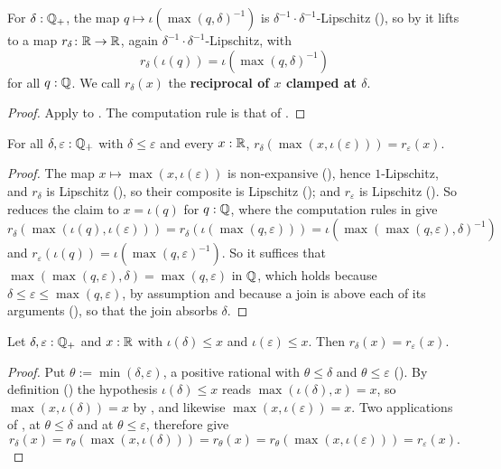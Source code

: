 \begin{definition}
  \label{boundedRecip}
  For $\delta : \mathbb{Q}_{+}$, the map $q \mapsto \iota(\max(q, \delta)^{-1})$ is $\delta^{-1} \cdot \delta^{-1}$-Lipschitz (), so by  it lifts to a map $r_\delta \colon \mathbb{R} \to \mathbb{R}$, again $\delta^{-1} \cdot \delta^{-1}$-Lipschitz, with
  \[
    r_\delta(\iota(q)) = \iota(\max(q, \delta)^{-1})
  \]
  for all $q : \mathbb{Q}$. We call $r_\delta(x)$ the \textbf{reciprocal of $x$ clamped at $\delta$}.
\end{definition}
\begin{proof}
  Apply  to . The computation rule is that of .
\end{proof}

\begin{lemma}
  \label{boundedRecipMax}
  For all $\delta, \varepsilon : \mathbb{Q}_{+}$ with $\delta \le \varepsilon$ and every $x : \mathbb{R}$, $r_\delta(\max(x, \iota(\varepsilon))) = r_\varepsilon(x)$.
\end{lemma}
\begin{proof}
  The map $x \mapsto \max(x, \iota(\varepsilon))$ is non-expansive (), hence $1$-Lipschitz, and $r_\delta$ is Lipschitz (), so their composite is Lipschitz (); and $r_\varepsilon$ is Lipschitz (). So  reduces the claim to $x = \iota(q)$ for $q : \mathbb{Q}$, where the computation rules in  give
  \[
    r_\delta(\max(\iota(q), \iota(\varepsilon))) = r_\delta(\iota(\max(q, \varepsilon))) = \iota(\max(\max(q, \varepsilon), \delta)^{-1})
  \]
  and $r_\varepsilon(\iota(q)) = \iota(\max(q, \varepsilon)^{-1})$. So it suffices that $\max(\max(q, \varepsilon), \delta) = \max(q, \varepsilon)$ in $\mathbb{Q}$, which holds because $\delta \le \varepsilon \le \max(q, \varepsilon)$, by assumption and because a join is above each of its arguments (), so that the join absorbs $\delta$.
\end{proof}

\begin{lemma}
  \label{boundedRecipEq}
  Let $\delta, \varepsilon : \mathbb{Q}_{+}$ and $x : \mathbb{R}$ with $\iota(\delta) \le x$ and $\iota(\varepsilon) \le x$. Then $r_\delta(x) = r_\varepsilon(x)$.
\end{lemma}
\begin{proof}
  Put $\theta := \min(\delta, \varepsilon)$, a positive rational with $\theta \le \delta$ and $\theta \le \varepsilon$ (). By definition () the hypothesis $\iota(\delta) \le x$ reads $\max(\iota(\delta), x) = x$, so $\max(x, \iota(\delta)) = x$ by , and likewise $\max(x, \iota(\varepsilon)) = x$. Two applications of , at $\theta \le \delta$ and at $\theta \le \varepsilon$, therefore give
  \[
    r_\delta(x) = r_\theta(\max(x, \iota(\delta))) = r_\theta(x) = r_\theta(\max(x, \iota(\varepsilon))) = r_\varepsilon(x).
  \]
\end{proof}

